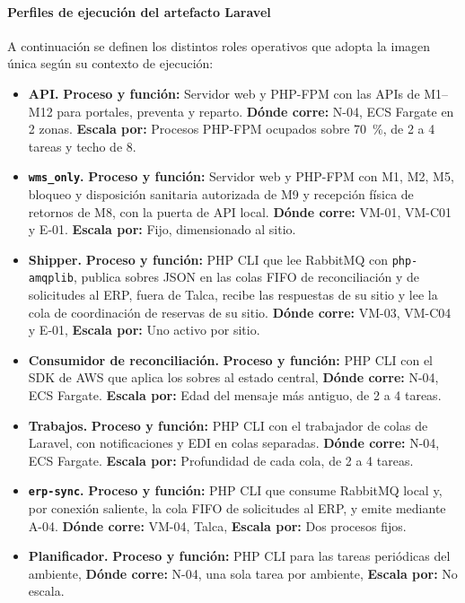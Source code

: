 \paragraph*{Perfiles de ejecución del artefacto Laravel}
\label{tab:perfiles}
A continuación se definen los distintos roles operativos que adopta la imagen única según su contexto de ejecución:
\begin{itemize}
\item \textbf{API.} \textbf{Proceso y función:} Servidor web y PHP-FPM con las APIs de M1--M12 para portales, preventa y reparto. \textbf{Dónde corre:} N-04, ECS Fargate en 2 zonas. \textbf{Escala por:} Procesos PHP-FPM ocupados sobre 70~\%, de 2 a 4 tareas y techo de 8.
\item \textbf{\texttt{wms\_only}.} \textbf{Proceso y función:} Servidor web y PHP-FPM con M1, M2, M5, bloqueo y disposición sanitaria autorizada de M9 y recepción física de retornos de M8, con la puerta de API local. \textbf{Dónde corre:} VM-01, VM-C01 y E-01. \textbf{Escala por:} Fijo, dimensionado al sitio.
\item \textbf{Shipper.} \textbf{Proceso y función:} PHP CLI que lee RabbitMQ con \texttt{php-amqplib}, publica sobres JSON en las colas FIFO de reconciliación y de solicitudes al ERP, fuera de Talca, recibe las respuestas de su sitio y lee la cola de coordinación de reservas de su sitio. \textbf{Dónde corre:} VM-03, VM-C04 y E-01, \textbf{Escala por:} Uno activo por sitio.
\item \textbf{Consumidor de reconciliación.} \textbf{Proceso y función:} PHP CLI con el SDK de AWS que aplica los sobres al estado central, \textbf{Dónde corre:} N-04, ECS Fargate. \textbf{Escala por:} Edad del mensaje más antiguo, de 2 a 4 tareas.
\item \textbf{Trabajos.} \textbf{Proceso y función:} PHP CLI con el trabajador de colas de Laravel, con notificaciones y EDI en colas separadas. \textbf{Dónde corre:} N-04, ECS Fargate. \textbf{Escala por:} Profundidad de cada cola, de 2 a 4 tareas.
\item \textbf{\texttt{erp-sync}.} \textbf{Proceso y función:} PHP CLI que consume RabbitMQ local y, por conexión saliente, la cola FIFO de solicitudes al ERP, y emite mediante A-04. \textbf{Dónde corre:} VM-04, Talca, \textbf{Escala por:} Dos procesos fijos.
\item \textbf{Planificador.} \textbf{Proceso y función:} PHP CLI para las tareas periódicas del ambiente, \textbf{Dónde corre:} N-04, una sola tarea por ambiente, \textbf{Escala por:} No escala.
\end{itemize}


